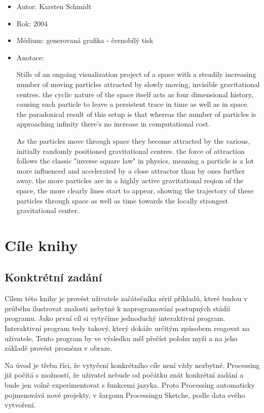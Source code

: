 \documentclass[11pt]{book}
\newcommand{\oddil}[1]{\section{#1}\label{sec:#1}}
\begin{document}
\begin{itemize}
\item
Autor: Karsten Schmidt
\item
Rok: 2004
\item
Médium: generovaná grafika - černobílý tisk
\item
Anotace:

Stills of an ongoing visualization project of a space with a steadily increasing number of moving particles attracted by slowly moving, invisible gravitational centres. the cyclic nature of the space itself acts as four dimensional history, causing each particle to leave a persistent trace in time as well as in space. the paradoxical result of this setup is that whereas the number of particles is approaching infinity there's no increase in computational cost.

As the particles move through space they become attracted by the various, initially randomly positioned gravitational centres. the force of attraction follows the classic "inverse square law" in physics, meaning a particle is a lot more influenced and accelerated by a close attractor than by ones further away. the more particles are in a highly active gravitational reqion of the space, the more clearly lines start to appear, showing the trajectory of these particles through space as well as time towards the locally strongest gravitational center.

\end{itemize}



\chapter{Cíle knihy}

\oddil{Konktrétní zadání}

Cílem této knihy je provést uživatele začátečníka sérií příkladů, které budou v průběhu ilustrovat znalosti nebytné k naprogramování postupných stádií programu. Jako první cíl si vytyčíme jednoduchý interaktivní program. Interaktivní program tedy takový, který dokáže určitým způsobem reagovat na uživatele. Tento program by ve výsledku měl přečíst polohu myši a na jeho základě provést proměnu v obraze.

Na úvod je třeba říci, že vytyčení konkrétního cíle není vždy nezbytné. Processing již počítá s možností, že uživatel nebude od počátku znát konkrétní zadání a bude jen volně experimentovat s funkcemi jazyka. Proto Processing automaticky pojmenovává nové projekty, v žargonu Processingu Sketche, podle data svého vytvoření.
\end{document}
